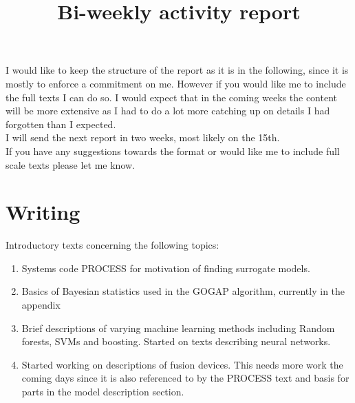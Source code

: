 \documentclass[a4paper,12pt]{article}
\begin{document}
\title{Bi-weekly activity report}
\maketitle
I would like to keep the structure of the report as it is in the following, since it is mostly to enforce a commitment on me. However if you would like me to include the full texts I can do so. I would expect that in the coming weeks the content will be more extensive as I had to do a lot more catching up on details I had forgotten than I expected.\\
I will send the next report in two weeks, most likely on the 15th.\\
If you have any suggestions towards the format or would like me to include full scale texts please let me know.

\section{Writing}
	Introductory texts concerning the following topics:
	\begin{enumerate}
		\item Systems code PROCESS for motivation of finding surrogate models.\\
		\item Basics of Bayesian statistics used in the GOGAP algorithm, currently in the appendix\\
		\item Brief descriptions of varying machine learning methods including Random forests, SVMs and boosting. Started on texts describing neural networks.
		\item Started working on descriptions of fusion devices. This needs more work the coming days since it is also referenced to by the PROCESS text and basis for parts in the model description section.
	\end{enumerate}
\end{document}
